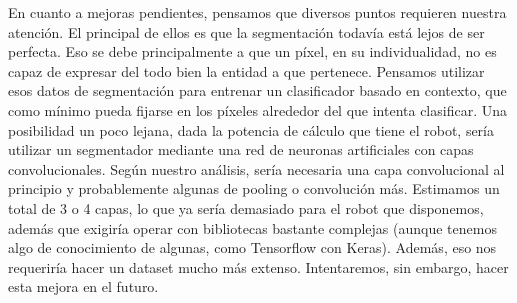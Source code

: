 \documentclass{article}
\begin{document}
	En cuanto a mejoras pendientes, pensamos que diversos puntos requieren nuestra atención. El principal de ellos es que la segmentación todavía está lejos de ser perfecta. Eso se debe principalmente a que un píxel, en su individualidad, no es capaz de expresar del todo bien la entidad a que pertenece. Pensamos utilizar esos datos de segmentación para entrenar un clasificador basado en contexto, que como mínimo pueda fijarse en los píxeles alrededor del que intenta clasificar. Una posibilidad un poco lejana, dada la potencia de cálculo que tiene el robot, sería utilizar un segmentador mediante una red de neuronas artificiales con capas convolucionales. Según nuestro análisis, sería necesaria una capa convolucional al principio y probablemente algunas de pooling o convolución más. Estimamos un total de 3 o 4 capas, lo que ya sería demasiado para el robot que disponemos, además que exigiría operar con bibliotecas bastante complejas (aunque tenemos algo de conocimiento de algunas, como Tensorflow con Keras). Además, eso nos requeriría hacer un dataset mucho más extenso. Intentaremos, sin embargo, hacer esta mejora en el futuro.








\end{document}
